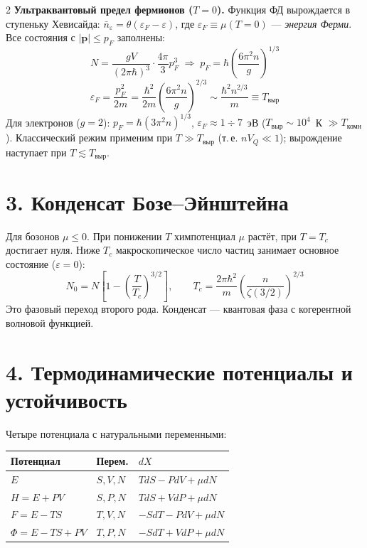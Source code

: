 \documentclass[a4paper,10pt]{article}
\begin{document}
\begin{multicols}{2}
\textbf{Ультраквантовый предел фермионов ($T=0$).} Функция ФД вырождается в ступеньку Хевисайда: $\bar{n}_\varepsilon = \theta(\varepsilon_F - \varepsilon)$, где $\varepsilon_F \equiv \mu(T{=}0)$ --- \emph{энергия Ферми}. Все состояния с $|\mathbf{p}| \leq p_F$ заполнены:
\begin{equation*}
    N = \frac{gV}{(2\pi\hbar)^3}\cdot\frac{4\pi}{3}p_F^3
    \;\Rightarrow\;
    p_F = \hbar\!\left(\frac{6\pi^2 n}{g}\right)^{\!1/3}
\end{equation*}
\begin{equation*}
    \varepsilon_F = \frac{p_F^2}{2m} = \frac{\hbar^2}{2m}\!\left(\frac{6\pi^2 n}{g}\right)^{\!2/3}
    \sim \frac{\hbar^2 n^{2/3}}{m} \equiv T_{\text{выр}}
\end{equation*}
Для электронов ($g=2$): $p_F = \hbar(3\pi^2 n)^{1/3}$, $\varepsilon_F \approx 1\div7$~эВ ($T_{\text{выр}}\sim 10^4$~К $\gg T_{\text{комн}}$). Классический режим применим при $T \gg T_{\text{выр}}$ (т.\,е. $nV_Q \ll 1$); вырождение наступает при $T \lesssim T_{\text{выр}}$.

\section*{3. Конденсат Бозе--Эйнштейна}

Для бозонов $\mu \leq 0$. При понижении $T$ химпотенциал $\mu$ растёт, при $T = T_c$ достигает нуля. Ниже $T_c$ макроскопическое число частиц занимает основное состояние ($\varepsilon = 0$):
\begin{equation*}
    N_0 = N\!\left[1 - \left(\frac{T}{T_c}\right)^{\!3/2}\right], \qquad
    T_c = \frac{2\pi\hbar^2}{m}\!\left(\frac{n}{\zeta(3/2)}\right)^{\!2/3}
\end{equation*}
Это фазовый переход второго рода. Конденсат --- квантовая фаза с когерентной волновой функцией.

\section*{4. Термодинамические потенциалы и устойчивость}

Четыре потенциала с натуральными переменными:
{\small
\renewcommand{\arraystretch}{1.1}
\begin{tabular}{@{}lll@{}}
\toprule
Потенциал & Перем. & $dX$ \\
\midrule
$E$ & $S,V,N$ & $TdS - PdV + \mu dN$ \\
$H = E+PV$ & $S,P,N$ & $TdS + VdP + \mu dN$ \\
$F = E-TS$ & $T,V,N$ & $-SdT - PdV + \mu dN$ \\
$\Phi = E-TS+PV$ & $T,P,N$ & $-SdT + VdP + \mu dN$ \\
\bottomrule
\end{tabular}
}


\end{multicols}
\end{document}
